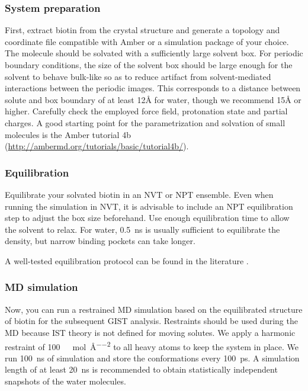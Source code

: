 \documentclass[9pt,tutorial]{livecoms}
\begin{document}
\subsubsection{System preparation}
First, extract biotin from the crystal structure and generate a topology and coordinate file compatible with Amber or a simulation package of your choice.
The molecule should be solvated with a sufficiently large solvent box. 
For periodic boundary conditions, the size of the solvent box should be large enough for the solvent to behave bulk-like so as to reduce artifact from solvent-mediated interactions between the periodic images. 
This corresponds to a distance between solute and box boundary of at least 12\AA{} for water, though we recommend 15\AA{} or higher.
Carefully check the employed force field, protonation state and partial charges.
A good starting point for the parametrization and solvation of small molecules is the Amber tutorial 4b (\url{http://ambermd.org/tutorials/basic/tutorial4b/}).

\subsubsection{Equilibration}
Equilibrate your solvated biotin in an NVT or NPT ensemble.
Even when running the simulation in NVT, it is advisable to include an NPT equilibration step to adjust the box size beforehand.
Use enough equilibration time to allow the solvent to relax. 
For water, \SI{0.5}{\nano\second} is usually sufficient to equilibrate the density, but narrow binding pockets can take longer.

A well-tested equilibration protocol can be found in the literature \cite{Roe2020-equilibration}.

\subsubsection{MD simulation}
\label{sec:md_simulation}
Now, you can run a restrained MD simulation based on the equilibrated structure of biotin for the subsequent GIST analysis.
Restraints should be used during the MD because IST theory is not defined for moving solutes.
We apply a harmonic restraint of \SI{100}{\kilo\calorie\per\mole\per\angstrom\squared} to all heavy atoms to keep the system in place.
We run \SI{100}{\nano\second} of simulation and store the conformations every \SI{100}{\pico\second}.
A simulation length of at least \SI{20}{\nano\second} is recommended to obtain statistically independent snapshots of the water molecules. 
\end{document}
